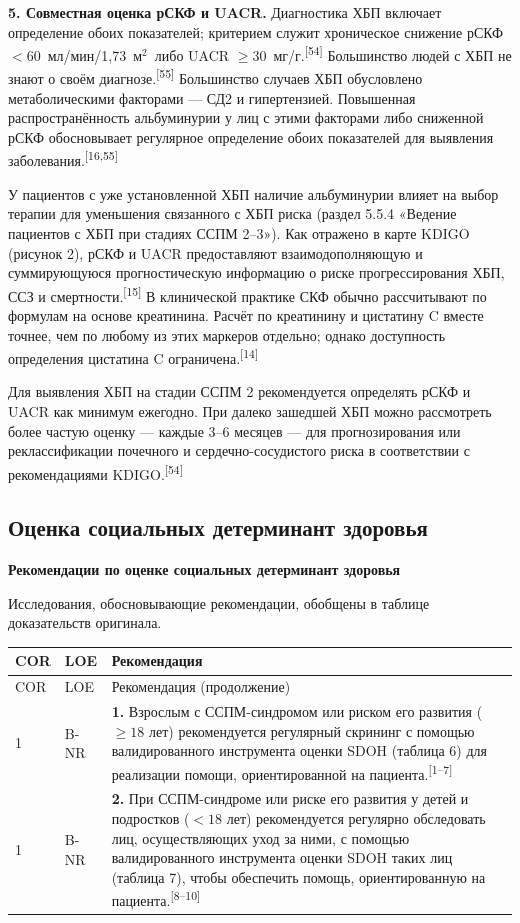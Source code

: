 \documentclass[11pt,a4paper]{article}
\newcommand{\src}[1]{\textsuperscript{[#1]}}
\newcommand{\heading}[1]{\par\medskip\textbf{#1}\par}
\newcommand{\unitgfr}{мл/мин/1,73~м$^2$}
\begin{document}
\textbf{5. Совместная оценка рСКФ и UACR.} Диагностика ХБП включает определение обоих показателей; критерием служит хроническое снижение рСКФ $<60$~\unitgfr\ либо UACR $\geq30$~мг/г.\src{54} Большинство людей с ХБП не знают о своём диагнозе.\src{55} Большинство случаев ХБП обусловлено метаболическими факторами --- СД2 и гипертензией. Повышенная распространённость альбуминурии у лиц с этими факторами либо сниженной рСКФ обосновывает регулярное определение обоих показателей для выявления заболевания.\src{16,55}

У пациентов с уже установленной ХБП наличие альбуминурии влияет на выбор терапии для уменьшения связанного с ХБП риска (раздел 5.5.4 «Ведение пациентов с ХБП при стадиях ССПМ 2--3»). Как отражено в карте KDIGO (рисунок 2), рСКФ и UACR предоставляют взаимодополняющую и суммирующуюся прогностическую информацию о риске прогрессирования ХБП, ССЗ и смертности.\src{15} В клинической практике СКФ обычно рассчитывают по формулам на основе креатинина. Расчёт по креатинину и цистатину C вместе точнее, чем по любому из этих маркеров отдельно; однако доступность определения цистатина C ограничена.\src{14}

Для выявления ХБП на стадии ССПМ 2 рекомендуется определять рСКФ и UACR как минимум ежегодно. При далеко зашедшей ХБП можно рассмотреть более частую оценку --- каждые 3--6 месяцев --- для прогнозирования или реклассификации почечного и сердечно-сосудистого риска в соответствии с рекомендациями KDIGO.\src{54}

\subsection{Оценка социальных детерминант здоровья}
\heading{Рекомендации по оценке социальных детерминант здоровья}
Исследования, обосновывающие рекомендации, обобщены в таблице доказательств оригинала.
{\small
\begin{longtable}{P{0.07\textwidth}P{0.11\textwidth}P{0.75\textwidth}}
\toprule COR & LOE & Рекомендация\\\midrule
\endfirsthead
\toprule COR & LOE & Рекомендация (продолжение)\\\midrule
{} & B-NR & \textbf{1.} Взрослым с ССПМ-синдромом или риском его развития ($\geq18$ лет) рекомендуется регулярный скрининг с помощью валидированного инструмента оценки SDOH (таблица 6) для реализации помощи, ориентированной на пациента.\src{1--7}\\[5pt]
1 & B-NR & \textbf{2.} При ССПМ-синдроме или риске его развития у детей и подростков ($<18$ лет) рекомендуется регулярно обследовать лиц, осуществляющих уход за ними, с помощью валидированного инструмента оценки SDOH таких лиц (таблица 7), чтобы обеспечить помощь, ориентированную на пациента.\src{8--10}\\
\bottomrule
\end{longtable}
}
\end{document}

